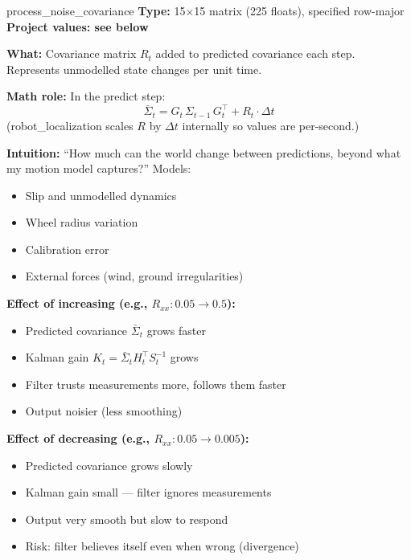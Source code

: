 \documentclass[11pt,a4paper]{article}
\begin{document}
\begin{paramcard}{process\_noise\_covariance}
\textbf{Type:} 15$\times$15 matrix (225 floats), specified row-major \quad \textbf{Project values: see below}

\textbf{What:} Covariance matrix $R_t$ added to predicted covariance each step. Represents unmodelled state changes per unit time.

\textbf{Math role:} In the predict step:
\[
\bar{\Sigma}_t = G_t\, \Sigma_{t-1}\, G_t^\top + R_t \cdot \Delta t
\]
(robot\_localization scales $R$ by $\Delta t$ internally so values are per-second.)

\textbf{Intuition:} ``How much can the world change between predictions, beyond what my motion model captures?'' Models:
\begin{itemize}
\item Slip and unmodelled dynamics
\item Wheel radius variation
\item Calibration error
\item External forces (wind, ground irregularities)
\end{itemize}

\textbf{Effect of increasing (e.g., $R_{xx}: 0.05 \to 0.5$):}
\begin{itemize}
\item Predicted covariance $\bar{\Sigma}_t$ grows faster
\item Kalman gain $K_t = \bar{\Sigma}_t H_t^\top S_t^{-1}$ grows
\item Filter trusts measurements more, follows them faster
\item Output noisier (less smoothing)
\end{itemize}

\textbf{Effect of decreasing (e.g., $R_{xx}: 0.05 \to 0.005$):}
\begin{itemize}
\item Predicted covariance grows slowly
\item Kalman gain small --- filter ignores measurements
\item Output very smooth but slow to respond
\item Risk: filter believes itself even when wrong (divergence)
\end{itemize}


\end{paramcard}
\end{document}
